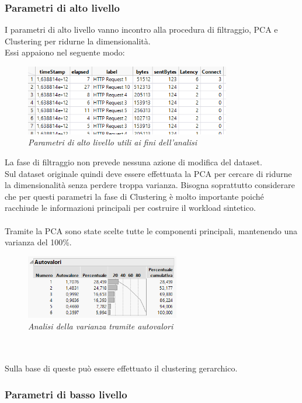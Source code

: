 \subsubsection{Parametri di alto livello}
I parametri di alto livello vanno incontro alla procedura di filtraggio, PCA e Clustering per ridurne la dimensionalità.
\\Essi appaiono nel seguente modo:
\begin{figure}[H]
	\centering
	\includegraphics[width=0.8\textwidth]{img/hw3/alto_livello_esempio.png}
	\caption{\textit{Parametri di alto livello utili ai fini dell'analisi}}
\end{figure}
La fase di filtraggio non prevede nessuna azione di modifica del dataset.
\\Sul dataset originale quindi deve essere effettuata la PCA per cercare di ridurne la dimensionalità senza perdere troppa varianza. Bisogna soprattutto considerare che per questi parametri la fase di Clustering è molto importante poiché racchiude le informazioni principali per costruire il workload sintetico.
\\
\\
Tramite la PCA sono state scelte tutte le componenti principali, mantenendo una varianza del 100\%.
\begin{figure}[H]
	\centering
	\includegraphics[width=0.6\textwidth]{img/hw3/autovalori.png}
	\caption{\textit{Analisi della varianza tramite autovalori}}
\end{figure}
\\
\\
Sulla base di queste può essere effettuato il clustering gerarchico.


\subsubsection{Parametri di basso livello}


